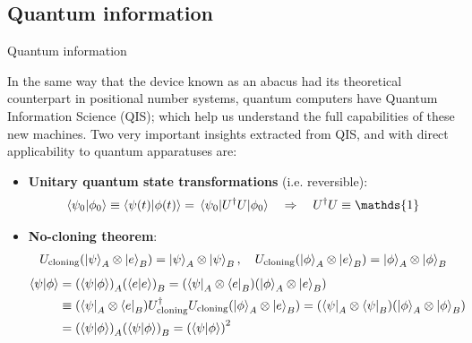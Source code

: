 \documentclass[9pt, handout, aspectratio=169]{beamer}	%
\begin{document}

\subsection{Quantum information}

\begin{frame}{Quantum information}

	In the same way that the device known as an abacus had its theoretical counterpart in positional number systems, quantum computers have Quantum Information Science (QIS); which help us understand the full capabilities of these new machines. Two very important insights extracted from QIS, and with direct applicability to quantum apparatuses are:

	\medskip

	\begin{itemize}
		\item<2-> \textbf{Unitary quantum state transformations} (i.e. reversible):\\
			\begin{gather*}
			  \braket{\psi_0}{\phi_0} \equiv \braket{\psi(t)}{\phi(t)} =
					\mel{\psi_0}{U^\dagger U}{\phi_0} \qRa U^\dagger U \equiv \mathds{1}
			\end{gather*}
		\item<3-> \textbf{No-cloning theorem}:\\
			\begin{gather*}
			  U_\text{cloning} \qty(\ket{\psi}_A \otimes \ket{e}_B) =
			    \ket{\psi}_A \otimes \ket{\psi}_B \qc
				U_\text{cloning} \qty(\ket{\phi}_A \otimes \ket{e}_B) =
			    \ket{\phi}_A \otimes \ket{\phi}_B \\
			\end{gather*}
			\vspace{-3em}
			\begin{align*}
				\braket{\psi}{\phi} &=
					\qty(\braket{\psi}{\phi})_A \qty(\braket{e}{e})_B =
					\qty(\bra{\psi}_A\otimes\bra{e}_B) \qty(\ket{\phi}_A\otimes\ket{e}_B) \\
				&\equiv \qty(\bra{\psi}_A\otimes\bra{e}_B)
						U_\text{cloning}^\dagger U_\text{cloning}
						\qty(\ket{\phi}_A\otimes\ket{e}_B) =
					\qty(\bra{\psi}_A\otimes\bra{\psi}_B)
						\qty(\ket{\phi}_A\otimes\ket{\phi}_B) \\
				&= \qty(\braket{\psi}{\phi})_A \qty(\braket{\psi}{\phi})_B =
					\qty(\braket{\psi}{\phi})^2
			\end{align*}
	\end{itemize}

\end{frame}
\end{document}
